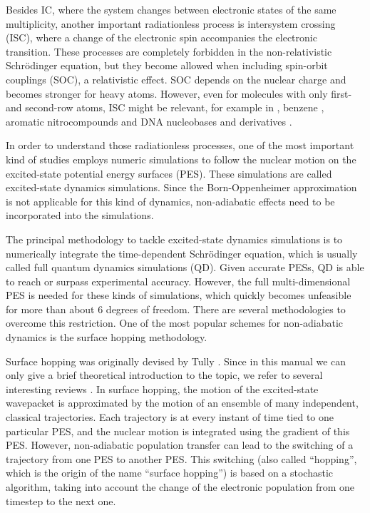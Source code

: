 \documentclass[a4paper,11pt,DIV=15,openany,twoside=false]{scrbook}
\begin{document}
Besides IC, where the system changes between electronic states of the same multiplicity, another important radiationless process is intersystem crossing (ISC), where a change of the electronic spin accompanies the electronic transition. These processes are completely forbidden in the non-relativistic Schr\"odinger equation, but they become allowed when including spin-orbit couplings (SOC), a relativistic effect.
SOC depends on the nuclear charge and becomes stronger for heavy atoms. However, even for molecules with only first- and second-row atoms, ISC might be relevant, for example in  \cite{Wilkinson2014JCP,Mai2014JCP_SO2,Leveque2014JCP_ISC}, benzene \cite{Penfold2012JCP}, aromatic nitrocompounds \cite{Vogt2013JPC} and DNA nucleobases and derivatives 
\cite{Crespo-Hernandez2004CR, Richter2012JPCL, Mai2013C, Reichardt2010CC}. 

In order to understand those radiationless processes, one of the most important kind of studies employs numeric simulations to follow the nuclear motion on the excited-state potential energy surfaces (PES). These simulations are called excited-state dynamics simulations. Since the Born-Oppenheimer approximation is not applicable for this kind of dynamics, non-adiabatic effects need to be incorporated into the simulations. 

The principal methodology to tackle excited-state dynamics simulations is to numerically integrate the time-dependent Schr\"odinger equation, which is usually called full quantum dynamics simulations (QD). Given accurate PESs, QD is able to reach or surpass experimental accuracy. However, the full multi-dimensional PES is needed for these kinds of simulations, which quickly becomes unfeasible for more than about 6 degrees of freedom. There are several methodologies to overcome this restriction. One of the most popular schemes for non-adiabatic dynamics is the surface hopping methodology.

Surface hopping was originally devised by Tully \cite{Tully1971JCP, Tully1990JCP}. Since in this manual we can only give a brief theoretical introduction to the topic, we refer to several interesting reviews \cite{Barbatti2011WCMS,Doltsinis2006,Doltsinis2002JTCC}.
In surface hopping, the motion of the excited-state wavepacket is approximated by the motion of an ensemble of many independent, classical trajectories. Each trajectory is at every instant of time tied to one particular PES, and the nuclear motion is integrated using the gradient of this PES. However, non-adiabatic population transfer can lead to the switching of a trajectory from one PES to another PES. This switching (also called ``hopping'', which is the origin of the name ``surface hopping'') is based on a stochastic algorithm, taking into account the change of the electronic population from one timestep to the next one.
\end{document}
